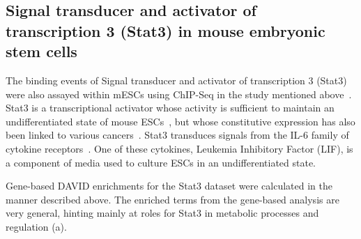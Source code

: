 \subsection{Signal transducer and activator of transcription 3 (Stat3) in mouse embryonic stem cells}
The binding events of Signal transducer and activator of transcription 3
(Stat3) were also assayed within mESCs using ChIP-Seq in
the study mentioned above~\citep{Chen2008}.
%
Stat3 is a transcriptional
activator whose activity is sufficient to maintain an undifferentiated state
of mouse ESCs~\citep{Matsuda1999}, but whose constitutive
expression has also been linked to various cancers~\citep{Bromberg1999}.
Stat3 transduces signals from the IL-6 family of cytokine receptors~\citep{Hirano2000}.
One of these cytokines, Leukemia Inhibitory Factor (LIF), is a component of media used
to culture ESCs in an undifferentiated state.
 
Gene-based DAVID enrichments for the Stat3 dataset were calculated in the manner described above.
The enriched terms from the gene-based analysis are very general, hinting mainly
at roles for Stat3 in metabolic processes and regulation (a).

